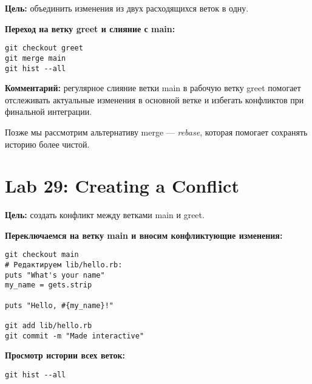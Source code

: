 \documentclass[a4paper,12pt]{report}
\begin{document}
\textbf{Цель:} объединить изменения из двух расходящихся веток в одну.

\textbf{Переход на ветку greet и слияние с main:}
\begin{verbatim}
git checkout greet
git merge main
git hist --all
\end{verbatim}



\textbf{Комментарий:} регулярное слияние ветки main в рабочую ветку greet помогает отслеживать актуальные изменения в основной ветке и избегать конфликтов при финальной интеграции.

Позже мы рассмотрим альтернативу merge — \textit{rebase}, которая помогает сохранять историю более чистой.


\section{Lab 29: Creating a Conflict}

\textbf{Цель:} создать конфликт между ветками main и greet.

\textbf{Переключаемся на ветку main и вносим конфликтующие изменения:}
\begin{verbatim}
git checkout main
# Редактируем lib/hello.rb:
puts "What's your name"
my_name = gets.strip

puts "Hello, #{my_name}!"

git add lib/hello.rb
git commit -m "Made interactive"
\end{verbatim}


\textbf{Просмотр истории всех веток:}
\begin{verbatim}
git hist --all
\end{verbatim}

\end{document}
